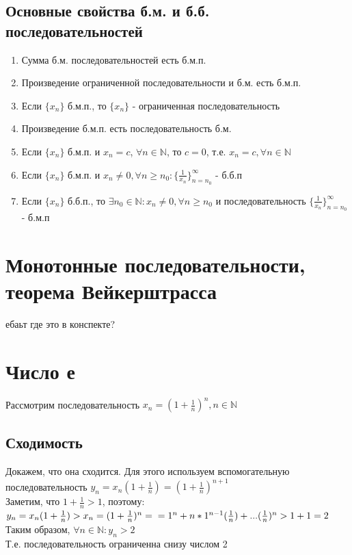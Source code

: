 \documentclass[oneside]{book}
\begin{document}
\begin{enumerate}
\section{Основные свойства б.м. и б.б. последовательностей}
\begin{enumerate}
\item Сумма б.м. последовательностей есть б.м.п.
\item Произведение ограниченной последовательности и б.м. есть б.м.п.
\item Если $\{x_n\}$ б.м.п., то $\{x_n\}$ - ограниченная последовательность
\item Произведение б.м.п. есть последовательность б.м.
\item Если $\{x_n\}$ б.м.п. и $x_n = c$, $\forall n \in \mathbb{N}$, то $c=0$, т.е. $x_n = c,  \forall n \in
\mathbb{N}$
\item Если $\{x_n\}$ б.м.п. и $x_n \neq 0,  \forall n\geq n_0: \{\frac{1}{x_n}\}^\infty_{n=n_0}$ - б.б.п
\item Если $\{x_n\}$ б.б.п., то $\exists n_0 \in \mathbb{N}:x_n \neq 0,  \forall n\geq n_0$ и последовательность $ \{\frac{1}{x_n}\}^\infty_{n=n_0}$ - б.м.п
\end{enumerate}


\chapter{Монотонные последовательности, теорема Вейкерштрасса}
ебаьт где это в конспекте?

\chapter{Число е}
Рассмотрим последовательность $x_n=(1+\frac{1}{n})^n, n \in \mathbb{N}$\\
\section{Сходимость}
Докажем, что она сходится. Для этого используем вспомогательную последовательность
$y_n=x_n(1+\frac{1}{n})=(1+\frac{1}{n})^{n+1}$\\
Заметим, что $1+\frac{1}{n}>1$, поэтому:\\ $y_n=x_n(1+\frac{1}{n})>x_n=(1+\frac{1}{n})^n=\\=1^n+n*1^{n-1}(\frac{1}{n})+...(\frac{1}{n})^n>1+1=2$
\\Таким образом, $\forall n \in \mathbb{N} :y_n>2$
\\Т.е. последовательность ограниченна снизу числом 2

\end{enumerate}
\end{document}
